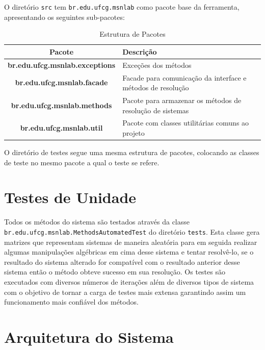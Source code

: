 \documentclass[a4paper,10pt]{report}
\begin{document}
O diretório \texttt{src} tem \texttt{br.edu.ufcg.msnlab} como pacote base da ferramenta, apresentando os seguintes sub-pacotes:

\begin{table}[ht]
\centering
\caption{Estrutura de Pacotes}
        \begin{tabular}{|c|p{2in}|}
        \hline
        \textbf{Pacote} & \textbf{Descrição} \\ \hline
        \textbf{br.edu.ufcg.msnlab.exceptions} & Exceções dos métodos \\ \hline
        \textbf{br.edu.ufcg.msnlab.facade} & Facade para comunicação da interface e métodos de resolução \\ \hline
        \textbf{br.edu.ufcg.msnlab.methods} & Pacote para armazenar os métodos de resolução de sistemas \\ \hline
        \textbf{br.edu.ufcg.msnlab.util} & Pacote com classes utilitárias comuns ao projeto \\ \hline
        \end{tabular}
\label{tab:pacotes}
\end{table} 

O diretório de testes segue uma mesma estrutura de pacotes, colocando as classes de teste no mesmo pacote a qual o teste se refere.

\section{Testes de Unidade}

Todos os métodos do sistema são testados através da classe \texttt{br.edu.ufcg.msnlab.MethodsAutomatedTest} do diretório \texttt{tests}. Esta classe gera matrizes que representam sistemas de maneira aleatória para em seguida realizar algumas manipulações algébricas em cima desse sistema e tentar resolvê-lo, se o resultado do sistema alterado for compatível com o resultado anterior desse sistema então o método obteve sucesso em sua resolução.
Os testes são executados com diversos números de iterações além de diversos tipos de sistema com o objetivo de tornar a carga de testes mais extensa garantindo assim um funcionamento mais confiável dos métodos.

\section{Arquitetura do Sistema}
\end{document}
